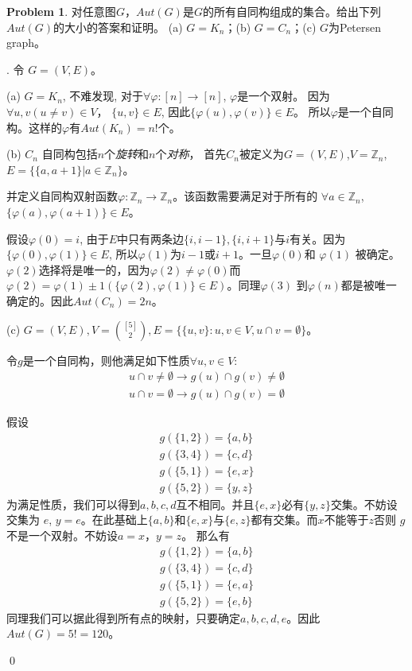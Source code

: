 \documentclass[UTF8]{ctexart}
\newenvironment{sol}
  {\par\vspace{3mm}\noindent{\it Solution}.}
  {\qed \\ \medskip}
\theoremstyle{definition}
\newtheorem{problem}{Problem}
\begin{document}
\begin{problem}
对任意图$G$，$Aut(G)$是$G$的所有自同构组成的集合。给出下列$Aut(G)$的大小的答案和证明。
(a) $G=K_n$；(b) $G = C_n$；(c) $G$为Petersen graph。

\begin{sol}
  令 $G = (V, E)$。

  (a) $G = K_n$, 不难发现, 对于$\forall \varphi:[n]\rightarrow[n]$, $\varphi$是一个双射。
  因为$\forall u, v(u \not= v) \in V$， $\{ u, v \} \in E$, 因此$\{ \varphi(u), \varphi(v) \} \in E$。
  所以$\varphi$是一个自同构。这样的$\varphi$有$Aut(K_n)=n!$个。

  (b) $C_n$ 自同构包括$n$个\textit{旋转}和$n$个\textit{对称}，
  首先$C_n$被定义为$G=(V,E)$,$V=\mathbb{Z}_n$, $E = \{ \{a, a+1\} | a \in \mathbb{Z}_n \}$。
  
  并定义自同构双射函数$\varphi: \mathbb{Z}_n \rightarrow \mathbb{Z}_n$。该函数需要满足对于所有的
  $\forall a \in \mathbb{Z}_n$, $\{ \varphi(a), \varphi(a+1) \} \in E$。

  假设$\varphi(0) = i$, 由于$E$中只有两条边$\{ i, i-1 \}, \{ i, i+1 \}$与$i$有关。因为
  $\{ \varphi(0), \varphi(1) \} \in E$, 所以$\varphi(1)$为$i-1$或$i+1$。一旦$\varphi(0)$和
  $\varphi(1)$ 被确定。$\varphi(2)$选择将是唯一的，因为$\varphi(2) \not= \varphi(0)$而
  $\varphi(2) = \varphi(1) \pm 1(\{ \varphi(2), \varphi(1)\} \in E)$。同理$\varphi(3)$
  到$\varphi(n)$都是被唯一确定的。因此$Aut(C_n)=2n$。

  (c) $G = (V,E), V = \binom{[5]}{2},E=\{ \{ u, v \} : u, v \in V, u \cap v = \emptyset \}$。
  
  令$g$是一个自同构，则他满足如下性质$\forall u, v \in V$:  
  \begin{align*}
    u \cap v \not= \emptyset \rightarrow g(u) \cap g(v) \not = \emptyset \\
    u \cap v = \emptyset \rightarrow g(u) \cap g(v) = \emptyset
  \end{align*}
  

  假设
  \begin{align*}
    g(\{ 1, 2\}) = \{a, b\} \\
    g(\{3,4\}) = \{c,d\} \\
    g(\{5,1\}) = \{e,x\} \\
    g(\{5,2\}) = \{y,z\} 
  \end{align*}
  为满足性质，我们可以得到$a, b, c, d$互不相同。并且$\{e,x\}$必有$\{y,z\}$交集。不妨设交集为
  $e$, $y=e$。在此基础上$\{a, b\}$和$\{e,x\}$与$\{e,z\}$都有交集。而$x$不能等于$z$否则
  $g$不是一个双射。不妨设$a=x$，$y=z$。
  那么有
  \begin{align*}
    g(\{ 1, 2\}) = \{a, b\} \\
    g(\{3,4\}) = \{c,d\} \\
    g(\{5,1\}) = \{e,a\} \\
    g(\{5,2\}) = \{e,b\} 
  \end{align*}
  同理我们可以据此得到所有点的映射，只要确定$a,b,c,d,e$。因此$Aut(G)=5!=120$。


\end{sol}
\end{problem}
\end{document}
